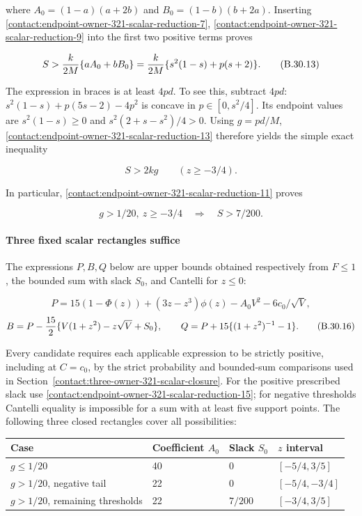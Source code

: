 where $A_0=(1-a)(a+2b)$ and $B_0=(1-b)(b+2a)$. Inserting \eqref{contact:endpoint-owner-321-scalar-reduction-7}, \eqref{contact:endpoint-owner-321-scalar-reduction-9} into
the first two positive terms proves

\[
 S>{k\over2M}\{aA_0+bB_0\}
 ={k\over2M}\{s^2(1-s)+p(s+2)\}.
\tag{B.30.13}\label{contact:endpoint-owner-321-scalar-reduction-13}
\]

The expression in braces is at least $4pd$. To see this, subtract $4pd$:
$s^2(1-s)+p(5s-2)-4p^2$ is concave in $p \in [0,s^2/4]$. Its endpoint
values are $s^2(1-s)\ge 0$ and $s^2(2+s-s^2)/4>0$.
Using $g=pd/M$, \eqref{contact:endpoint-owner-321-scalar-reduction-13} therefore yields the simple exact inequality

\[
 \boxed{S>2kg\qquad(z\ge-3/4).}
\tag{B.30.14}\label{contact:endpoint-owner-321-scalar-reduction-14}
\]

In particular, \eqref{contact:endpoint-owner-321-scalar-reduction-11} proves

\[
 \boxed{g>1/20,\ z\ge-3/4\quad\Longrightarrow\quad S>7/200.}
\tag{B.30.15}\label{contact:endpoint-owner-321-scalar-reduction-15}
\]

\paragraph{Three fixed scalar rectangles suffice}

The expressions $P,B,Q$ below are upper bounds obtained respectively from $F\le 1$,
the bounded sum with slack $S_0$, and Cantelli for $z\le 0$:

\[
 P=15(1-\Phi(z))+(3z-z^3)\phi(z)-A_0V^2-6c_0/\sqrt V,
\]
\[
 B=P-{15\over2}\{V(1+z^2)-z\sqrt V+S_0\},\qquad
 Q=P+15\{(1+z^2)^{-1}-1\}.
\tag{B.30.16}\label{contact:endpoint-owner-321-scalar-reduction-16}
\]

Every candidate requires each applicable expression to be strictly positive,
including at $C=c_0$, by the strict probability and bounded-sum
comparisons used in Section~\ref{contact:three-owner-321-scalar-closure}.
For the positive prescribed slack use
\eqref{contact:endpoint-owner-321-scalar-reduction-15}; for negative
thresholds Cantelli equality is impossible for a sum with at least five
support points.
The following three closed rectangles cover all possibilities:

\begin{center}\small
\begin{tabular}{llll}\toprule
Case & Coefficient $A_0$ & Slack $S_0$ & $z$ interval\\\midrule
$g\le 1/20$ & 40 & 0 & $[-5/4,3/5]$\\
$g>1/20$, negative tail & 22 & 0 & $[-5/4,-3/4]$\\
$g>1/20$, remaining thresholds & 22 & $7/200$ & $[-3/4,3/5]$\\
\bottomrule\end{tabular}\end{center}

